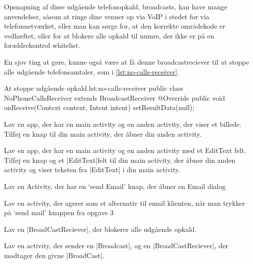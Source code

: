 Opsnapning af disse udgående telefonopkald, broadcasts, kan have mange anvendelser, såsom at ringe dine venner op via VoIP i stedet for via telefonnetværket, eller man kan sørge for, at den korrekte områdekode er vedhæftet, eller for at blokere alle opkald til numre, der ikke er på en forældrekontrol whitelist.

En sjov ting at gøre, kunne også være at få denne broadcastreciever til at stoppe alle udgående telefonsamtaler, som i \autoref{lst:no-calls-receiver}.

\begin{JavaCode}{At stoppe udgående opkald.}{lst:no-calls-receiver}
	public class NoPhoneCallsReceiver extends BroadcastReceiver {
		@Override
		public void onReceive(Context context, Intent intent) {
			setResultData(null);
		}
	}
\end{JavaCode}

\begin{exercise}
	Lav en app, der har en main activity og en anden activity, der viser et billede. Tilføj en knap til din main activity, der åbner din anden activity.
\end{exercise}

\begin{exercise}
	Lav en app, der har en main activity og en anden activity med et EditText felt. Tilføj en knap og et \JavaInline|EditText|felt til din main activity, der åbner din anden activity og viser teksten fra \JavaInline|EditText| i din main activity.
\end{exercise}

\begin{exercise}
	Lav en Activity, der har en ‘send Email’ knap, der åbner en Email dialog
\end{exercise}

\begin{exercise}
	Lav en activity, der agerer som et alternativ til email klienten, når man trykker på ‘send mail’ knappen fra opgave 3
\end{exercise}

\begin{exercise}
	Lav en \JavaInline|BroadCastReciever|, der blokerer alle udgående opkald.
\end{exercise}

\begin{exercise}
	Lav en activity, der sender en \JavaInline|Broadcast|, og en \JavaInline|BroadCastReciever|, der modtager den givne \JavaInline|BroadCast|.
\end{exercise}

